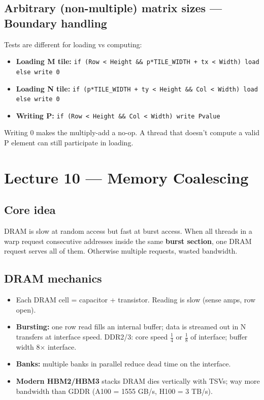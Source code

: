 \documentclass[10pt]{article}
\begin{document}
\subsection*{Arbitrary (non-multiple) matrix sizes — Boundary handling}
Tests are different for loading vs computing:
\begin{itemize}
  \item \textbf{Loading M tile:} \texttt{if (Row < Height \&\& p*TILE\_WIDTH + tx < Width) load else write 0}
  \item \textbf{Loading N tile:} \texttt{if (p*TILE\_WIDTH + ty < Height \&\& Col < Width) load else write 0}
  \item \textbf{Writing P:} \texttt{if (Row < Height \&\& Col < Width) write Pvalue}
\end{itemize}
Writing 0 makes the multiply-add a no-op. A thread that doesn't compute a valid P element can still participate in loading.

\hrulefill

\section{Lecture 10 — Memory Coalescing}

\subsection*{Core idea}
DRAM is slow at random access but fast at burst access. When all threads in a warp request consecutive addresses inside the same \textbf{burst section}, one DRAM request serves all of them. Otherwise multiple requests, wasted bandwidth.

\subsection*{DRAM mechanics}
\begin{itemize}
  \item Each DRAM cell = capacitor + transistor. Reading is slow (sense amps, row open).
  \item \textbf{Bursting:} one row read fills an internal buffer; data is streamed out in N transfers at interface speed. DDR2/3: core speed $\frac{1}{4}$ or $\frac{1}{8}$ of interface; buffer width 8$\times$ interface.
  \item \textbf{Banks:} multiple banks in parallel reduce dead time on the interface.
  \item \textbf{Modern HBM2/HBM3} stacks DRAM dies vertically with TSVs; way more bandwidth than GDDR (A100 = 1555 GB/s, H100 = 3 TB/s).
\end{itemize}
\end{document}
